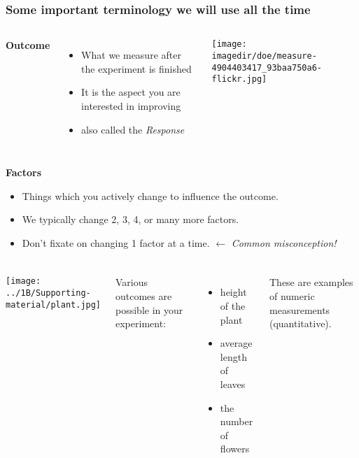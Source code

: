 \documentclass[handout,11pt,aspectratio=169,mathserif]{beamer}
\begin{document}
\begin{frame}\frametitle{Some important terminology we will use all the time}

	\begin{columns}[T]
			\textbf{{\color{purple} Outcome}}
				\begin{itemize}
					\item	What we measure after the experiment is finished  \pause
					\item	It is the aspect you are interested in improving  \pause
					\item	also called the \emph{Response}

				\end{itemize}

			\centerline{\texttt{[image: \\imagedir/doe/measure-4904403417\_93baa750a6-flickr.jpg]}}
	\end{columns}

	\vspace{24pt}
	\textbf{{\color{purple} Factors}}
		\begin{itemize}
			\item	Things which you actively change to influence the outcome.
			\item	We typically change 2, 3, 4, or many more factors. \pause
			\item	Don't fixate on changing 1 factor at a time. {\color{myOrange}  $\longleftarrow$	\emph{Common misconception!}}
		\end{itemize}
\end{frame}

\begin{frame}\frametitle{}

	\begin{columns}[c]
			\centerline{\texttt{[image: ../1B/Supporting-material/plant.jpg]}}

			Various outcomes are possible in your experiment:

			\begin{itemize}
				\item	height of the plant
				\item	average length of leaves
				\item	the number of flowers
			\end{itemize}

			\vspace{12pt}
			These are examples of numeric measurements (quantitative).

	\end{columns}
\end{frame}
\end{document}
